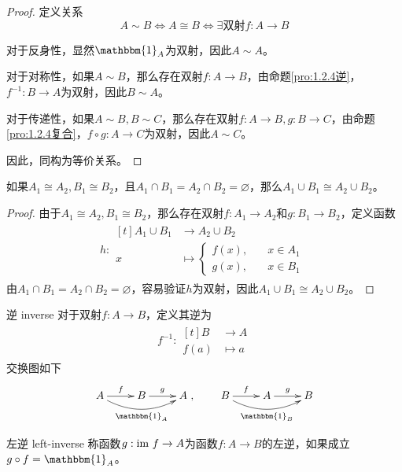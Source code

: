 \begin{proof}
	定义关系
	$$
	A\sim B \iff A\cong B \iff \exists\text{双射}f:A\to B
	$$
	
	对于反身性，显然$\mathbbm{1}_A$为双射，因此$A\sim A$。
	
	对于对称性，如果$A\sim B$，那么存在双射$f:A\to B$，由命题\ref{pro:1.2.4逆}，$f^{-1}:B\to A$为双射，因此$B\sim A$。
	
	对于传递性，如果$A\sim B,B\sim C$，那么存在双射$f:A\to B,g:B\to C$，由命题\ref{pro:1.2.4复合}，$f\circ g:A\to C$为双射，因此$A\sim C$。
	
	因此，同构为等价关系。
\end{proof}

\begin{proposition}
	如果$A_1\cong A_2,B_1\cong B_2$，且$A_1\cap B_1=A_2\cap B_2=\varnothing$，那么$A_1\cup B_1\cong A_2\cup B_2$。
\end{proposition}

\begin{proof}
	由于$A_1\cong A_2,B_1\cong B_2$，那么存在双射$f:A_1\to A_2$和$g:B_1\to B_2$，定义函数
	\begin{align*}
		h:\begin{aligned}[t]
			A_1\cup B_1&\longrightarrow A_2\cup B_2\\
			x&\longmapsto 
			\begin{cases}
				f(x),\quad & x\in A_1\\
				g(x),\quad & x\in B_1
			\end{cases}
		\end{aligned}
	\end{align*}
	由$A_1\cap B_1=A_2\cap B_2=\varnothing$，容易验证$h$为双射，因此$A_1\cup B_1\cong A_2\cup B_2$。
\end{proof}

\begin{definition}{逆 inverse}
	对于双射$f:A\to B$，定义其逆为
	\begin{align*}
		f^{-1}:\begin{aligned}[t]
			B&\longrightarrow A\\
			f(a)&\longmapsto a
		\end{aligned}
	\end{align*}
	交换图如下
	$$
	\xymatrix{
		A \ar@/_1pc/[rr]_{\mathbbm{1}_A} \ar^f[r] &B \ar^g[r] &A
	},\qquad 
	\xymatrix{
		B \ar@/_1pc/[rr]_{\mathbbm{1}_B} \ar^f[r] &A \ar^g[r] &B
	}
	$$
\end{definition}

\begin{definition}{左逆 left-inverse}
	称函数$g:\text{im } f\to A$为函数$f:A\to B$的左逆，如果成立$g\circ f=\mathbbm{1}_A$。
\end{definition}


